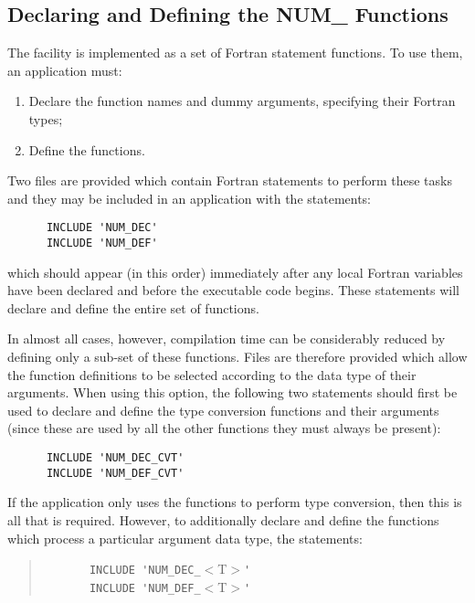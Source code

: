 \subsection{Declaring and Defining the NUM\_ Functions}
\label{section:include}

The  facility is implemented as a set of Fortran statement
functions.  To use them, an application must: 

\begin{enumerate}

\item Declare the function names and dummy arguments, specifying their
Fortran types;

\item Define the functions.

\end{enumerate}

Two files are provided which contain Fortran statements to perform these
tasks and they may be included in an application with the statements: 

\begin{verbatim}
      INCLUDE 'NUM_DEC'
      INCLUDE 'NUM_DEF'
\end{verbatim}

which should appear (in this order) immediately after any local Fortran
variables have been declared and before the executable code begins. 
These statements will declare and define the entire set of 
functions.

In almost all cases, however, compilation time can be considerably reduced
by defining only a sub-set of these functions.
Files are therefore provided which allow the function definitions to be
selected according to the data type of their arguments. 
When using this option, the following two statements should first be used to
declare and define the type conversion functions and their arguments (since
these are used by all the other  functions they must always be
present): 

\begin{verbatim}
      INCLUDE 'NUM_DEC_CVT'
      INCLUDE 'NUM_DEF_CVT'
\end{verbatim}

If the application only uses the  functions to perform type 
conversion, then this is all that is required.
However, to additionally declare and define the  functions which
process a particular argument data type, the statements: 

\begin{quote}
\verb#       INCLUDE 'NUM_DEC_#$<$T$>$\verb#'#\\
\verb#       INCLUDE 'NUM_DEF_#$<$T$>$\verb#'#
\end{quote}

